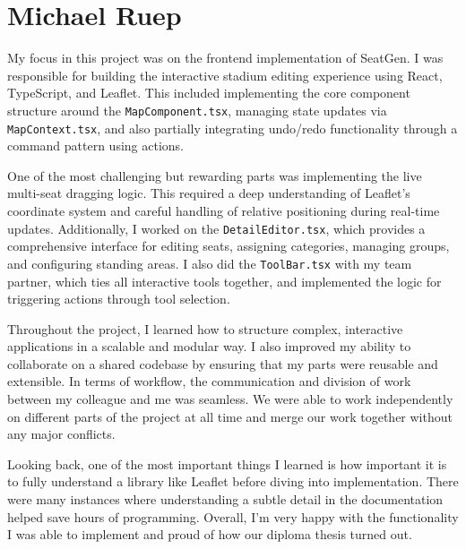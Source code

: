 \section{Michael Ruep}

My focus in this project was on the frontend implementation of SeatGen. I was responsible for building the interactive stadium editing experience using React, TypeScript, and Leaflet. This included implementing the core component structure around the \texttt{MapComponent.tsx}, managing state updates via \texttt{MapContext.tsx}, and also partially integrating undo/redo functionality through a command pattern using actions.

One of the most challenging but rewarding parts was implementing the live multi-seat dragging logic. This required a deep understanding of Leaflet’s coordinate system and careful handling of relative positioning during real-time updates. Additionally, I worked on the \texttt{DetailEditor.tsx}, which provides a comprehensive interface for editing seats, assigning categories, managing groups, and configuring standing areas. I also did the \texttt{ToolBar.tsx} with my team partner, which ties all interactive tools together, and implemented the logic for triggering actions through tool selection.

Throughout the project, I learned how to structure complex, interactive applications in a scalable and modular way. I also improved my ability to collaborate on a shared codebase by ensuring that my parts were reusable and extensible. In terms of workflow, the communication and division of work between my colleague and me was seamless. We were able to work independently on different parts of the project at all time and merge our work together without any major conflicts.

Looking back, one of the most important things I learned is how important it is to fully understand a library like Leaflet before diving into implementation. There were many instances where understanding a subtle detail in the documentation helped save hours of programming. Overall, I’m very happy with the functionality I was able to implement and proud of how our diploma thesis turned out.

